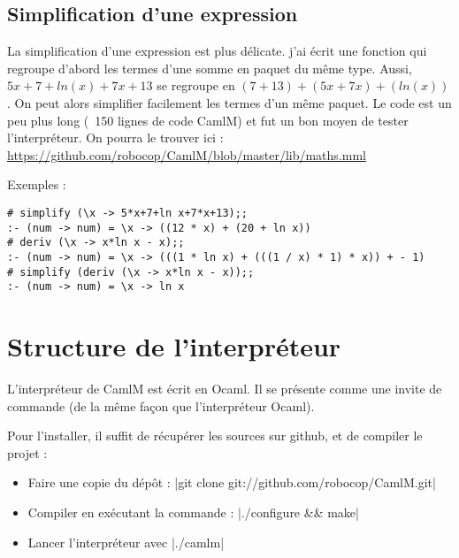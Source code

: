 \documentclass[a4paper, 12pt]{article}
\begin{document}
\subsection{Simplification d'une expression}

La simplification d'une expression est plus délicate. j'ai écrit une fonction qui regroupe d'abord les termes d'une somme en paquet du même type.
Aussi, $5x+7+ln(x)+7x+13$ se regroupe en $(7+13)+(5x+7x)+(ln(x))$. On peut alors simplifier facilement les termes d'un même paquet.
Le code est un peu plus long (~150 lignes de code CamlM) et fut un bon moyen de tester l'interpréteur.
On pourra le trouver ici : \url{https://github.com/robocop/CamlM/blob/master/lib/maths.mml}

Exemples : 
\begin{lstlisting}
# simplify (\x -> 5*x+7+ln x+7*x+13);;
:- (num -> num) = \x -> ((12 * x) + (20 + ln x))
# deriv (\x -> x*ln x - x);;
:- (num -> num) = \x -> (((1 * ln x) + (((1 / x) * 1) * x)) + - 1)
# simplify (deriv (\x -> x*ln x - x));;
:- (num -> num) = \x -> ln x
\end{lstlisting}

\section{Structure de l'interpréteur}

L’interpréteur de CamlM est écrit en Ocaml.
Il se présente comme une invite de commande (de la même façon que l’interpréteur Ocaml).

Pour l'installer, il suffit de récupérer les sources sur github, et de compiler le projet : 

\begin{itemize}
\item Faire une copie du dépôt : |git clone git://github.com/robocop/CamlM.git|
\item Compiler en exécutant la commande  : |./configure && make|
\item Lancer l’interpréteur avec |./camlm|
\end{itemize}
\end{document}
